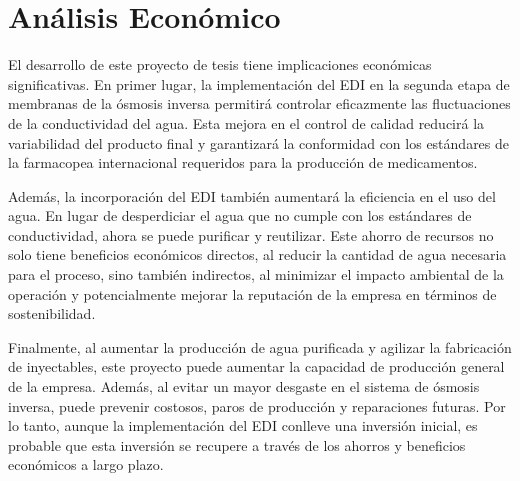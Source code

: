 \section{Análisis Económico}
El desarrollo de este proyecto de tesis tiene implicaciones económicas significativas. En primer lugar, la implementación del EDI en la segunda etapa de membranas de la ósmosis inversa permitirá controlar eficazmente las fluctuaciones de la conductividad del agua. Esta mejora en el control de calidad reducirá la variabilidad del producto final y garantizará la conformidad con los estándares de la farmacopea internacional requeridos para la producción de medicamentos.

Además, la incorporación del EDI también aumentará la eficiencia en el uso del agua. En lugar de desperdiciar el agua que no cumple con los estándares de conductividad, ahora se puede purificar y reutilizar. Este ahorro de recursos no solo tiene beneficios económicos directos, al reducir la cantidad de agua necesaria para el proceso, sino también indirectos, al minimizar el impacto ambiental de la operación y potencialmente mejorar la reputación de la empresa en términos de sostenibilidad.

Finalmente, al aumentar la producción de agua purificada y agilizar la fabricación de inyectables, este proyecto puede aumentar la capacidad de producción general de la empresa. Además, al evitar un mayor desgaste en el sistema de ósmosis inversa, puede prevenir costosos, paros de producción y reparaciones futuras. Por lo tanto, aunque la implementación del EDI conlleve una inversión inicial, es probable que esta inversión se recupere a través de los ahorros y beneficios económicos a largo plazo.









